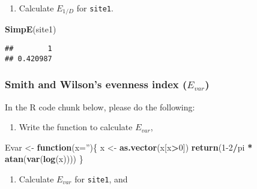 \documentclass[
]{article}
\newenvironment{Shaded}{\begin{snugshade}}{\end{snugshade}}
\newcommand{\ControlFlowTok}[1]{\textcolor[rgb]{0.13,0.29,0.53}{\textbf{#1}}}
\newcommand{\DataTypeTok}[1]{\textcolor[rgb]{0.13,0.29,0.53}{#1}}
\newcommand{\DecValTok}[1]{\textcolor[rgb]{0.00,0.00,0.81}{#1}}
\newcommand{\KeywordTok}[1]{\textcolor[rgb]{0.13,0.29,0.53}{\textbf{#1}}}
\newcommand{\NormalTok}[1]{#1}
\newcommand{\OperatorTok}[1]{\textcolor[rgb]{0.81,0.36,0.00}{\textbf{#1}}}
\newcommand{\StringTok}[1]{\textcolor[rgb]{0.31,0.60,0.02}{#1}}
\providecommand{\tightlist}{%
  \setlength{\itemsep}{0pt}\setlength{\parskip}{0pt}}
\begin{document}
\begin{enumerate}
\def\labelenumi{\arabic{enumi}.}
\setcounter{enumi}{1}
\tightlist
\item
  Calculate \(E_{1/D}\) for \texttt{site1}.
\end{enumerate}

\begin{Shaded}
\begin{Highlighting}[]
\KeywordTok{SimpE}\NormalTok{(site1)}
\end{Highlighting}
\end{Shaded}

\begin{verbatim}
##        1 
## 0.420987
\end{verbatim}

\hypertarget{smith-and-wilsons-evenness-index-e_var}{%
\subsubsection{\texorpdfstring{Smith and Wilson's evenness index
(\(E_{var}\))}{Smith and Wilson's evenness index (E\_\{var\})}}\label{smith-and-wilsons-evenness-index-e_var}}

In the R code chunk below, please do the following:

\begin{enumerate}
\def\labelenumi{\arabic{enumi}.}
\tightlist
\item
  Write the function to calculate \(E_{var}\),
\end{enumerate}

\begin{Shaded}
\begin{Highlighting}[]
\NormalTok{Evar <-}\StringTok{ }\ControlFlowTok{function}\NormalTok{(}\DataTypeTok{x=}\StringTok{''}\NormalTok{)\{}
\NormalTok{  x <-}\StringTok{ }\KeywordTok{as.vector}\NormalTok{(x[x}\OperatorTok{>}\DecValTok{0}\NormalTok{])}
  \KeywordTok{return}\NormalTok{(}\DecValTok{1-2}\OperatorTok{/}\NormalTok{pi }\OperatorTok{*}\StringTok{ }\KeywordTok{atan}\NormalTok{(}\KeywordTok{var}\NormalTok{(}\KeywordTok{log}\NormalTok{(x))))}
\NormalTok{\}}
\end{Highlighting}
\end{Shaded}

\begin{enumerate}
\def\labelenumi{\arabic{enumi}.}
\setcounter{enumi}{1}
\tightlist
\item
  Calculate \(E_{var}\) for \texttt{site1}, and
\end{enumerate}
\end{document}
